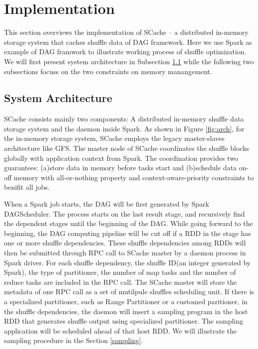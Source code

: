 \section{Implementation}\label{impl}
This section overviews the implementation of SCache -- a distributed in-memory storage system that caches shuffle data of DAG framework. Here we use Spark as example of DAG framwork to illustrate working process of shuffle optimization. We will first present system architecture in Subsection \ref{arch} while the following two subsections focuss on the two constraints on memory manangement.

\subsection{System Architecture}\label{arch}
SCache consists mainly two components: A distributed in-memory shuffle data storage system and the daemon inside Spark. As shown in Figure \ref{fig:arch}, for the in-memory storage system, SCache employs the legacy master-slaves architecture like GFS\cite{gfs}. The master node of SCache coordinates the shuffle blocks globally with application context from Spark. The coordination provides two guarantees: (a)store data in memory before tasks start and (b)schedule data on-off memory with all-or-nothing property and context-aware-priority constraints to benifit all jobs. 

When a Spark job starts, the DAG will be first generated by Spark DAGScheduler\cite{sparksource}. The process starts on the last result stage, and recursively find the dependent stages until the beginning of the DAG. While going forward to the beginning, the DAG computing pipeline will be cut off if a RDD in the stage has one or more shuffle dependencies. These shuffle dependencies among RDDs will then be submitted through RPC call to SCache master by a daemon process in Spark driver. For each shuffle dependency, the shuffle ID(an integer generated by Spark), the type of partitioner, the number of map tasks and the number of reduce tasks are included in the RPC call. The SCache master will store the metadata of one RPC call as a set of mutilpule shuffles scheduling unit. If there is a specialized partitioner, such as Range Partitioner or a customed paritioner, in the shuffle dependencies, the daemon will insert a sampling program in the host RDD that generates shuffle output using specialized partitioner. The sampling application will be scheduled ahead of that host RDD. We will illustrate the sampling procedure in the Section \ref{sampling}.

